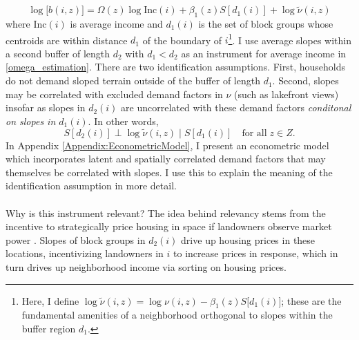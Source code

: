 \documentclass[12pt]{article}
\begin{document}
\begin{equation}\label{omega_estimation}
		\log\big[b(i, z)\big] = \Omega(z)\log\text{Inc}(i) + \beta_{1}(z)S[d_{1}(i)] + \log \tilde{\nu}(i, z)
\end{equation}
where $\text{Inc}(i)$ is average income and $d_{1}(i)$ is the set of block groups whose centroids are within distance $d_{1}$ of the boundary of $i$\footnote{Here, I define $\log \tilde{\nu}(i, z) = \log \nu(i, z) - \beta_{1}(z)S\big[d_{1}(i)\big]$; these are the fundamental amenities of a neighborhood orthogonal to slopes within the buffer region $d_{1}$.}. I use average slopes within a second buffer of length $d_{2}$ with $d_{1} < d_{2}$ as an instrument for average income in \eqref{omega_estimation}. There are two identification assumptions. First, households do not demand sloped terrain outside of the buffer of length $d_{1}$. Second, slopes may be correlated with excluded demand factors in $\nu$ (such as lakefront views) insofar as slopes in $d_{2}(i)$ are uncorrelated with these demand factors \textit{conditonal on slopes in $d_{1}(i)$}. In other words,
\begin{equation}
	S[d_{2}(i)] \perp \log \tilde{\nu}(i, z) \; | \; S[d_{1}(i)] \quad \text{for all} \; z \in Z.
\end{equation}
In Appendix \ref{Appendix:EconometricModel}, I present an econometric model which incorporates latent and spatially correlated demand factors that may themselves be correlated with slopes. I use this to explain the meaning of the identification assumption in more detail. 

\paragraph*{}
Why is this instrument relevant? The idea behind relevancy stems from the incentive to strategically price housing in space if landowners observe market power \citep{BFMJPE, anagoletal2021}. Slopes of block groups in $d_{2}(i)$ drive up housing prices in these locations, incentivizing landowners in $i$ to increase prices in response, which in turn drives up neighborhood income via sorting on housing prices.  
\end{document}
